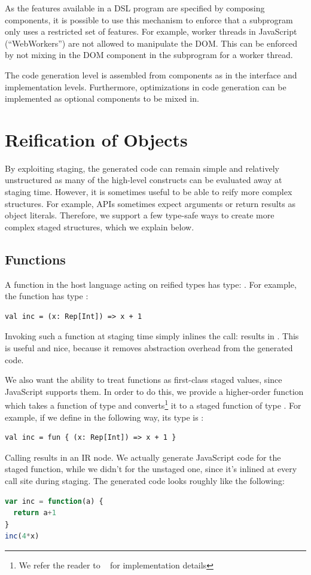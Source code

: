 \documentclass[runningheads,a4paper]{llncs}
\begin{document}
As the features available in a DSL program are specified by composing
components, it is possible to use this mechanism to enforce that a
subprogram only uses a restricted set of features. For example, worker
threads in JavaScript (``WebWorkers'') are not allowed to manipulate
the DOM. This can be enforced by not mixing in the DOM component in
the subprogram for a worker thread.

The code generation level is assembled from components as in the
interface and implementation levels. Furthermore, optimizations in
code generation can be implemented as optional components to be mixed
in.

\section{Reification of Objects}\label{sec:reification}

By exploiting staging, the generated code can remain simple and
relatively unstructured as many of the high-level constructs can be
evaluated away at staging time. However, it is sometimes useful to be
able to reify more complex structures. For example, APIs sometimes
expect arguments or return results as object literals. Therefore, we
support a few type-safe ways to create more complex staged structures,
which we explain below.

\subsection{Functions}\label{sec:functions}

A function in the host language acting on reified types has type:
. For example, the function  has type
:
\begin{lstlisting}
val inc = (x: Rep[Int]) => x + 1
\end{lstlisting}

Invoking such a function at staging time simply inlines the call:
 results in . This is useful and nice,
because it removes abstraction overhead from the generated
code.

We also want the ability to treat functions as first-class staged
values, since JavaScript supports them. In order to do this, we
provide a higher-order function  which takes a function of
type  and converts\footnote{We refer the reader
  to ~\cite{lms} for implementation details} it to a staged function
of type . For example, if we define  in
the following way, its type is :
\begin{lstlisting}
val inc = fun { (x: Rep[Int]) => x + 1 }
\end{lstlisting}
Calling  results in an  IR node. We
actually generate JavaScript code for the staged  function,
while we didn't for the unstaged one, since it's inlined at every call
site during staging. The generated code looks roughly like the
following:
\begin{lstlisting}[language=JavaScript]
var inc = function(a) {
  return a+1
}
inc(4*x)
\end{lstlisting}
\end{document}
